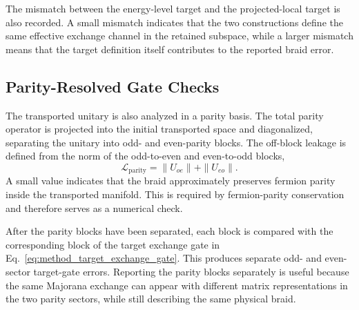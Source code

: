 The mismatch between the energy-level target and the projected-local target is also recorded. A small mismatch indicates that the two constructions define the same effective exchange channel in the retained subspace, while a larger mismatch means that the target definition itself contributes to the reported braid error.

\subsection{Parity-Resolved Gate Checks}
The transported unitary is also analyzed in a parity basis. The total parity operator is projected into the initial transported space and diagonalized, separating the unitary into odd- and even-parity blocks. The off-block leakage is defined from the norm of the odd-to-even and even-to-odd blocks,
\begin{equation}
\mathcal{L}_{\mathrm{parity}}
=
\|U_{oe}\|
+
\|U_{eo}\|.
\end{equation}
A small value indicates that the braid approximately preserves fermion parity inside the transported manifold. This is required by fermion-parity conservation and therefore serves as a numerical check.

After the parity blocks have been separated, each block is compared with the corresponding block of the target exchange gate in Eq.~\ref{eq:method_target_exchange_gate}. This produces separate odd- and even-sector target-gate errors. Reporting the parity blocks separately is useful because the same Majorana exchange can appear with different matrix representations in the two parity sectors, while still describing the same physical braid.
